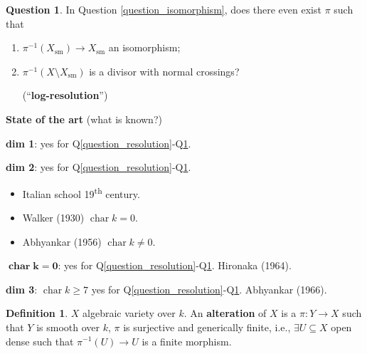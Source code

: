 \documentclass[12pt]{article}
\DeclareMathOperator{\chara}{char}
\theoremstyle{definition}
\newtheorem*{definition}{Definition}
\newtheorem{question}{Question}
\theoremstyle{remark}
\begin{document}
\begin{question}\label{question_log-resolution}
In Question \ref{question_isomorphism}, does there even exist $\pi$ such that
\begin{enumerate}[label=\roman*)]
\item $\pi^{-1}(X_{\text{sm}})\rightarrow X_{\text{sm}}$ an isomorphism;
\item $\pi^{-1}(X\setminus X_{\text{sm}})$ is a divisor with normal crossings?

\begin{center}
\end{center}

(``\textbf{log-resolution}'')
\end{enumerate}
\end{question}

\textbf{State of the art} (what is known?)

\textbf{dim 1}: yes for Q\ref{question_resolution}-Q\ref{question_log-resolution}.

\textbf{dim 2}: yes for Q\ref{question_resolution}-Q\ref{question_log-resolution}.
\begin{itemize}[label=$-$]
\item Italian school 19\textsuperscript{th} century.
\item Walker (1930) $\chara k=0$.
\item Abhyankar (1956) $\chara k\neq0$.
\end{itemize}

$\boldsymbol{\chara k=0}$: yes for Q\ref{question_resolution}-Q\ref{question_log-resolution}. Hironaka (1964).

\textbf{dim 3}: $\chara k\geq7$ yes for Q\ref{question_resolution}-Q\ref{question_log-resolution}. Abhyankar (1966).

\begin{definition}
$X$ algebraic variety over $k$. An \textbf{alteration} of $X$ is a $\pi:Y\rightarrow X$ such that $Y$ is smooth over $k$, $\pi$ is surjective and generically finite, i.e., $\exists U\subseteq X$ open dense such that $\pi^{-1}(U)\rightarrow U$ is a finite morphism.
\end{definition}
\end{document}
